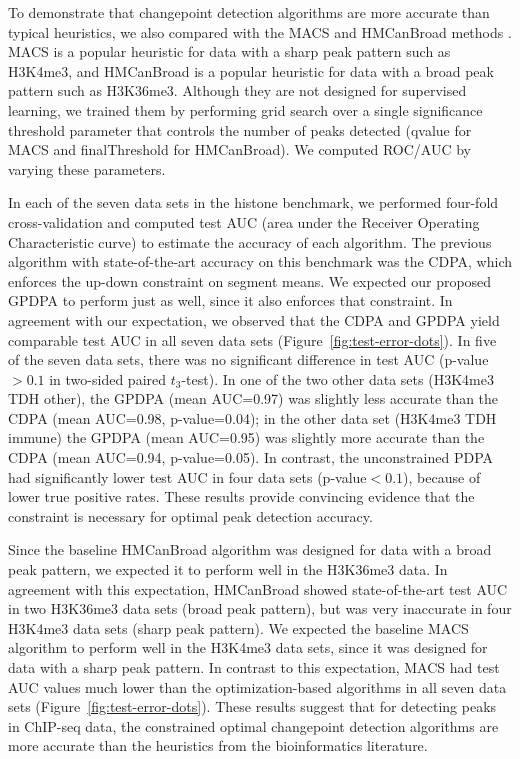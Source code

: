 \documentclass[twoside,11pt]{article}
\begin{document}
To demonstrate that changepoint detection algorithms are more accurate
than typical heuristics, we also
compared with the MACS and HMCanBroad methods \citep{MACS,
  HMCan}. MACS is a popular heuristic for data with a sharp peak
pattern such as H3K4me3, and \mbox{HMCanBroad} is a popular heuristic
for data with a broad peak pattern such as H3K36me3. Although they are
not designed for supervised learning, we trained them by performing
grid search over a single significance threshold parameter that
controls the number of peaks detected (qvalue for MACS and
finalThreshold for HMCanBroad). We computed ROC/AUC by varying these
parameters.


In each of the seven data sets in the histone benchmark,
we performed four-fold cross-validation and computed test AUC (area
under the Receiver Operating Characteristic curve) to estimate the
accuracy of each algorithm. The previous algorithm with
state-of-the-art accuracy on this benchmark was the CDPA, which
enforces the up-down constraint on segment means. We expected our
proposed GPDPA to perform just as well, since it also enforces that
constraint. In agreement with our expectation, we observed that the
CDPA and GPDPA yield comparable test AUC in all seven data sets
(Figure~\ref{fig:test-error-dots}). In five of the seven data sets,
there was no significant difference in test AUC (p-value$>0.1$ in
two-sided paired $t_3$-test). In one of the two other data sets
(H3K4me3 TDH other), the GPDPA (mean AUC=0.97) was slightly less
accurate than the CDPA (mean AUC=0.98, p-value=0.04); in the other
data set (H3K4me3 TDH immune) the GPDPA (mean AUC=0.95) was slightly
more accurate than the CDPA (mean AUC=0.94, p-value=0.05). In contrast, the
unconstrained PDPA had significantly lower test AUC in four data sets
(p-value$<0.1$), because of lower true positive rates. These results
provide convincing evidence that the constraint is necessary for
optimal peak detection accuracy.

Since the baseline HMCanBroad algorithm was designed for data with a
broad peak pattern, we expected it to perform well in the H3K36me3
data. In agreement with this expectation, HMCanBroad showed
state-of-the-art test AUC in two H3K36me3 data sets (broad peak
pattern), but was very inaccurate in four H3K4me3 data sets (sharp
peak pattern). We expected the baseline MACS algorithm to perform well
in the H3K4me3 data sets, since it was designed for data with a sharp
peak pattern. In contrast to this expectation, MACS had test AUC
values much lower than the optimization-based algorithms in all seven
data sets (Figure~\ref{fig:test-error-dots}). These results suggest
that for detecting peaks in ChIP-seq data, the constrained optimal
changepoint detection algorithms are more accurate than the heuristics
from the bioinformatics literature.
\end{document}
